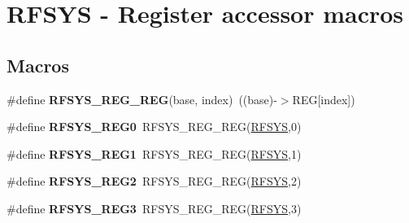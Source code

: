 \hypertarget{group__RFSYS__Register__Accessor__Macros}{}\section{R\+F\+S\+YS -\/ Register accessor macros}
\label{group__RFSYS__Register__Accessor__Macros}
\subsection*{Macros}
\begin{DoxyCompactItemize}
\item 
\#define {\bfseries R\+F\+S\+Y\+S\+\_\+\+R\+E\+G\+\_\+\+R\+EG}(base,  index)~((base)-\/$>$R\+EG\mbox{[}index\mbox{]})\hypertarget{group__RFSYS__Register__Accessor__Macros_ga36edbfa031a900d1d306d1beb5fdb8ba}{}\label{group__RFSYS__Register__Accessor__Macros_ga36edbfa031a900d1d306d1beb5fdb8ba}

\item 
\#define {\bfseries R\+F\+S\+Y\+S\+\_\+\+R\+E\+G0}~R\+F\+S\+Y\+S\+\_\+\+R\+E\+G\+\_\+\+R\+EG(\hyperlink{group__RFSYS__Peripheral__Access__Layer_ga83a5a75f5421c69ce93437b8be3c1144}{R\+F\+S\+YS},0)\hypertarget{group__RFSYS__Register__Accessor__Macros_gac8659efbc5335c7c55ce700f560e641f}{}\label{group__RFSYS__Register__Accessor__Macros_gac8659efbc5335c7c55ce700f560e641f}

\item 
\#define {\bfseries R\+F\+S\+Y\+S\+\_\+\+R\+E\+G1}~R\+F\+S\+Y\+S\+\_\+\+R\+E\+G\+\_\+\+R\+EG(\hyperlink{group__RFSYS__Peripheral__Access__Layer_ga83a5a75f5421c69ce93437b8be3c1144}{R\+F\+S\+YS},1)\hypertarget{group__RFSYS__Register__Accessor__Macros_ga20ef6da127caf2238db5623847eb2ada}{}\label{group__RFSYS__Register__Accessor__Macros_ga20ef6da127caf2238db5623847eb2ada}

\item 
\#define {\bfseries R\+F\+S\+Y\+S\+\_\+\+R\+E\+G2}~R\+F\+S\+Y\+S\+\_\+\+R\+E\+G\+\_\+\+R\+EG(\hyperlink{group__RFSYS__Peripheral__Access__Layer_ga83a5a75f5421c69ce93437b8be3c1144}{R\+F\+S\+YS},2)\hypertarget{group__RFSYS__Register__Accessor__Macros_gaae849d61adc6c407683197d3dd93e2b8}{}\label{group__RFSYS__Register__Accessor__Macros_gaae849d61adc6c407683197d3dd93e2b8}

\item 
\#define {\bfseries R\+F\+S\+Y\+S\+\_\+\+R\+E\+G3}~R\+F\+S\+Y\+S\+\_\+\+R\+E\+G\+\_\+\+R\+EG(\hyperlink{group__RFSYS__Peripheral__Access__Layer_ga83a5a75f5421c69ce93437b8be3c1144}{R\+F\+S\+YS},3)\hypertarget{group__RFSYS__Register__Accessor__Macros_ga66bdcfc079cddd40f67493cf57742ec4}{}\label{group__RFSYS__Register__Accessor__Macros_ga66bdcfc079cddd40f67493cf57742ec4}


\end{DoxyCompactItemize}
